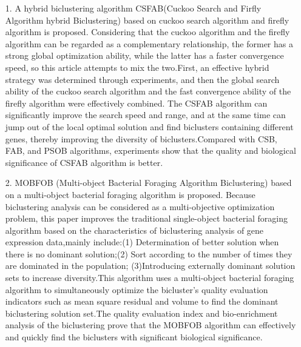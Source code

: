 \begin{eabstract}
  \begin{itemize}
    \item[1.] {  A hybrid biclustering algorithm CSFAB(Cuckoo Search and Firfly Algorithm hybrid Biclustering) based on cuckoo search algorithm and firefly algorithm is proposed. Considering that the cuckoo algorithm and the firefly algorithm can be regarded as a complementary relationship, the former has a strong global optimization ability, while the latter has a faster convergence speed, so this article attempts to mix the two.First, an effective hybrid strategy was determined through experiments, and then the global search ability of the cuckoo search algorithm and the fast convergence ability of the firefly algorithm were effectively combined. The CSFAB algorithm can significantly improve the search speed and range, and at the same time can jump out of the local optimal solution and find biclusters containing different genes, thereby improving the diversity of biclusters.Compared with CSB, FAB, and PSOB algorithms, experiments show that the quality and biological significance of CSFAB algorithm is better.}

    \item[2.] { MOBFOB (Multi-object Bacterial Foraging Algorithm Biclustering) based on a multi-object bacterial foraging algorithm is proposed. Because biclustering analysis can be considered as a multi-objective optimization problem, this paper improves the traditional single-object bacterial foraging algorithm based on the characteristics of biclustering analysis of gene expression data,mainly include:(1)  Determination of better solution when there is no dominant solution;(2) Sort according to the number of times they are dominated in the population; (3)Introducing externally dominant solution sets to increase diversity.This algorithm uses a multi-object bacterial foraging algorithm to simultaneously optimize the bicluster's quality evaluation indicators such as mean square residual and volume to find the dominant biclustering solution set.The quality evaluation index and bio-enrichment analysis of the biclustering prove that the MOBFOB algorithm can effectively and quickly find the biclusters with significant biological significance.}
  \end{itemize}


\end{eabstract}